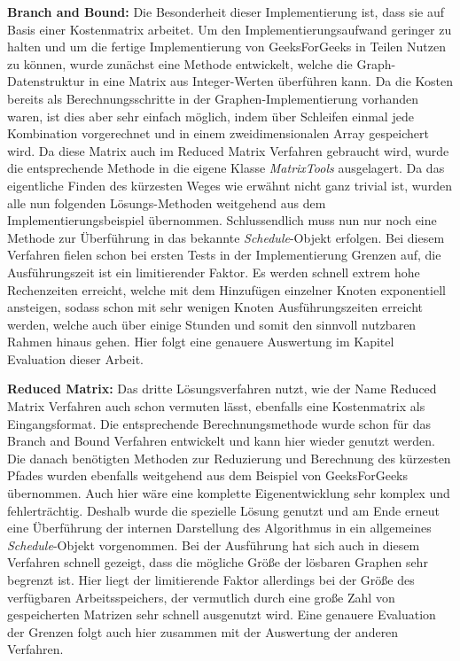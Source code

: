 \textbf{Branch and Bound:} Die Besonderheit dieser Implementierung ist, dass sie auf Basis einer Kostenmatrix arbeitet. Um den Implementierungsaufwand geringer zu halten und um die fertige Implementierung von GeeksForGeeks \cite{geeksForGeeksBnB} in Teilen Nutzen zu können, wurde zunächst eine Methode entwickelt, welche die Graph-Datenstruktur in eine Matrix aus Integer-Werten überführen kann. Da die Kosten bereits als Berechnungsschritte in der Graphen-Implementierung vorhanden waren, ist dies aber sehr einfach möglich, indem über Schleifen einmal jede Kombination vorgerechnet und in einem zweidimensionalen Array gespeichert wird. Da diese Matrix auch im Reduced Matrix Verfahren gebraucht wird, wurde die entsprechende Methode in die eigene Klasse \textit{MatrixTools} ausgelagert. Da das eigentliche Finden des kürzesten Weges wie erwähnt nicht ganz trivial ist, wurden alle nun folgenden Lösungs-Methoden weitgehend aus dem Implementierungsbeispiel übernommen. Schlussendlich muss nun nur noch eine Methode zur Überführung in das bekannte \textit{Schedule}-Objekt erfolgen. Bei diesem Verfahren fielen schon bei ersten Tests in der Implementierung Grenzen auf, die Ausführungszeit ist ein limitierender Faktor. Es werden schnell extrem hohe Rechenzeiten erreicht, welche mit dem Hinzufügen einzelner Knoten exponentiell ansteigen, sodass schon mit sehr wenigen Knoten Ausführungszeiten erreicht werden, welche auch über einige Stunden und somit den sinnvoll nutzbaren Rahmen hinaus gehen. Hier folgt eine genauere Auswertung im Kapitel Evaluation dieser Arbeit.

\textbf{Reduced Matrix:} Das dritte Lösungsverfahren nutzt, wie der Name Reduced Matrix Verfahren auch schon vermuten lässt, ebenfalls eine Kostenmatrix als Eingangsformat. Die entsprechende Berechnungsmethode wurde schon für das Branch and Bound Verfahren entwickelt und kann hier wieder genutzt werden. Die danach benötigten Methoden zur Reduzierung und Berechnung des kürzesten Pfades wurden ebenfalls weitgehend aus dem Beispiel von GeeksForGeeks \cite{geeksForGeeksRm} übernommen. Auch hier wäre eine komplette Eigenentwicklung sehr komplex und fehlerträchtig. Deshalb wurde die spezielle Lösung genutzt und am Ende erneut eine Überführung der internen Darstellung des Algorithmus in ein allgemeines \textit{Schedule}-Objekt vorgenommen. Bei der Ausführung hat sich auch in diesem Verfahren schnell gezeigt, dass die mögliche Größe der lösbaren Graphen sehr begrenzt ist. Hier liegt der limitierende Faktor allerdings bei der Größe des verfügbaren Arbeitsspeichers, der vermutlich durch eine große Zahl von gespeicherten Matrizen sehr schnell ausgenutzt wird. Eine genauere Evaluation der Grenzen folgt auch hier zusammen mit der Auswertung der anderen Verfahren.


